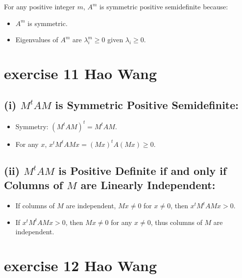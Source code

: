 \documentclass{article}
\begin{document}
For any positive integer \(m\), \(A^m\) is symmetric positive semidefinite because:
\begin{itemize}
    \item \(A^m\) is symmetric.
    \item Eigenvalues of \(A^m\) are \(\lambda_i^m \geq 0\) given \(\lambda_i \geq 0\).
\end{itemize}


\section{exercise 11 Hao Wang}

\subsection*{(i) \(M^t A M\) is Symmetric Positive Semidefinite:}

\begin{itemize}
    \item Symmetry: \((M^t A M)^t = M^t A M\).
    \item For any \(x\), \(x^t M^t A M x = (Mx)^t A (M x) \geq 0\).
\end{itemize}

\subsection*{(ii) \(M^t A M\) is Positive Definite if and only if Columns of \(M\) are Linearly Independent:}

\begin{itemize}
    \item If columns of \(M\) are independent, \(M x \neq 0\)  for \(x \neq 0\), then \(x^t M^t A M x > 0\).
    \item If \(x^t M^t A M x > 0\), then \(M x \neq 0\) for any \(x \neq 0\), thus columns of \(M\) are independent.
\end{itemize}

\section{exercise 12 Hao Wang}
\end{document}
